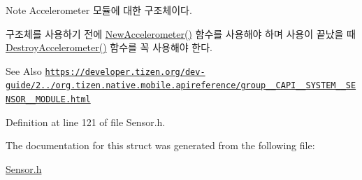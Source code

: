 \begin{DoxyNote}{Note}
Accelerometer 모듈에 대한 구조체이다. \par
 구조체를 사용하기 전에 \hyperlink{Sensor_8h_abcf9601a4eab47e714e89190dc79ad50}{New\-Accelerometer()} 함수를 사용해야 하며 사용이 끝났을 때 \hyperlink{Sensor_8h_a275aeca9a471074bf414e5e9b817c8c1}{Destroy\-Accelerometer()} 함수를 꼭 사용해야 한다. 
\end{DoxyNote}
\begin{DoxySeeAlso}{See Also}
\href{https://developer.tizen.org/dev-guide/2.3.0/org.tizen.native.mobile.apireference/group__CAPI__SYSTEM__SENSOR__MODULE.html}{\tt https\-://developer.\-tizen.\-org/dev-\/guide/2../org.\-tizen.\-native.\-mobile.\-apireference/group\-\_\-\-\_\-\-C\-A\-P\-I\-\_\-\-\_\-\-S\-Y\-S\-T\-E\-M\-\_\-\-\_\-\-S\-E\-N\-S\-O\-R\-\_\-\-\_\-\-M\-O\-D\-U\-L\-E.\-html} 
\end{DoxySeeAlso}


Definition at line 121 of file Sensor.\-h.



The documentation for this struct was generated from the following file\-:\begin{DoxyCompactItemize}
\item 
\hyperlink{Sensor_8h}{Sensor.\-h}\end{DoxyCompactItemize}
